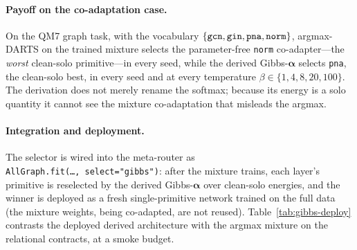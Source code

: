 \documentclass[11pt]{article}
\newcommand{\allowbreakhere}{\discretionary{}{}{}}
\newcommand{\code}[1]{\texttt{\def\_{\char`_\allowbreakhere}#1}}
\newcommand{\alphapar}{\bm{\alpha}}
\begin{document}
\paragraph{Payoff on the co-adaptation case.} On the QM7 graph task, with the vocabulary
$\{\code{gcn},\allowbreak\code{gin},\allowbreak\code{pna},\allowbreak\code{norm}\}$, argmax-DARTS on the trained mixture selects the
parameter-free \code{norm} co-adapter---the \emph{worst} clean-solo primitive---in every seed, while the
derived Gibbs-$\alphapar$ selects \code{pna}, the clean-solo best, in every seed and at every temperature
$\beta\in\{1,4,8,20,100\}$. The derivation does not merely rename the softmax; because its energy is a
solo quantity it cannot see the mixture co-adaptation that misleads the argmax.

\paragraph{Integration and deployment.} The selector is wired into the meta-router as
\code{AllGraph.fit(\ldots,\ select="gibbs")}: after the mixture trains, each layer's primitive is
reselected by the derived Gibbs-$\alphapar$ over clean-solo energies, and the winner is deployed as a
fresh single-primitive network trained on the full data (the mixture weights, being co-adapted, are not
reused). Table~\ref{tab:gibbs-deploy} contrasts the deployed derived architecture with the argmax mixture
on the relational contracts, at a smoke budget.
\end{document}

